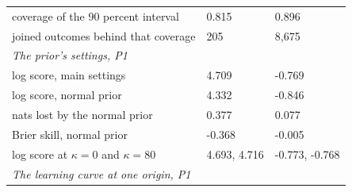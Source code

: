 \begin{tabular}{lll}
coverage of the 90 percent interval & 0.815 & 0.896 \\
joined outcomes behind that coverage & 205 & 8,675 \\
\midrule
\multicolumn{3}{l}{\emph{The prior's settings, P1}} \\
log score, main settings & 4.709 & -0.769 \\
log score, normal prior & 4.332 & -0.846 \\
nats lost by the normal prior & 0.377 & 0.077 \\
Brier skill, normal prior & -0.368 & -0.005 \\
log score at $\kappa = 0$ and $\kappa = 80$ & 4.693, 4.716 & -0.773, -0.768 \\
\midrule
\multicolumn{3}{l}{\emph{The learning curve at one origin, P1}} \\

\end{tabular}
